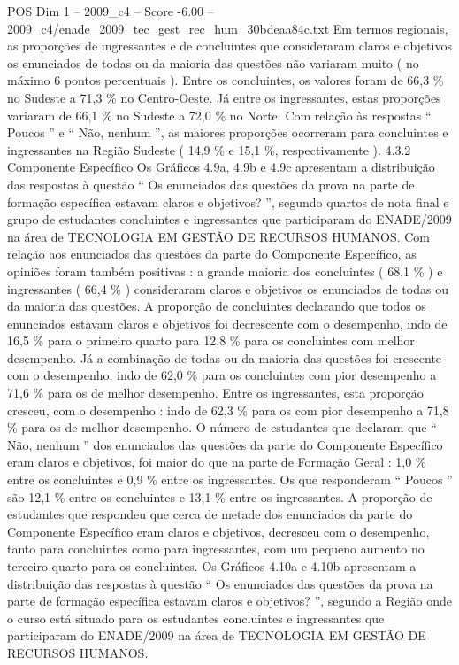 \begin{textsample}{POS Dim 1 – 2009\_c4 – Score -6.00 – 2009\_c4/enade\_2009\_tec\_gest\_rec\_hum\_30bdeaa84c.txt}
Em termos regionais, as proporções de ingressantes e de concluintes que consideraram claros e objetivos os enunciados de todas ou da maioria das questões não variaram muito ( no máximo 6 pontos percentuais ).
Entre os concluintes, os valores foram de 66,3 \% no Sudeste a 71,3 \% no Centro-Oeste.
Já entre os ingressantes, estas proporções variaram de 66,1 \% no Sudeste a 72,0 \% no Norte.
Com relação às respostas “ Poucos ” e “ Não, nenhum ”, as maiores proporções ocorreram para concluintes e ingressantes na Região Sudeste ( 14,9 \% e 15,1 \%, respectivamente ). 4.3.2 Componente Específico Os Gráficos 4.9a, 4.9b e 4.9c apresentam a distribuição das respostas à questão “ Os enunciados das questões da prova na parte de formação específica estavam claros e objetivos? ”, segundo quartos de nota final e grupo de estudantes concluintes e ingressantes que participaram do ENADE/2009 na área de TECNOLOGIA EM GESTÃO DE RECURSOS HUMANOS.
Com relação aos enunciados das questões da parte do Componente Específico, as opiniões foram também positivas : a grande maioria dos concluintes ( 68,1 \% ) e ingressantes ( 66,4 \% ) consideraram claros e objetivos os enunciados de todas ou da maioria das questões.
A proporção de concluintes declarando que todos os enunciados estavam claros e objetivos foi decrescente com o desempenho, indo de 16,5 \% para o primeiro quarto para 12,8 \% para os concluintes com melhor desempenho.
Já a combinação de todas ou da maioria das questões foi crescente com o desempenho, indo de 62,0 \% para os concluintes com pior desempenho a 71,6 \% para os de melhor desempenho.
Entre os ingressantes, esta proporção cresceu, com o desempenho : indo de 62,3 \% para os com pior desempenho a 71,8 \% para os de melhor desempenho.
O número de estudantes que declaram que “ Não, nenhum ” dos enunciados das questões da parte do Componente Específico eram claros e objetivos, foi maior do que na parte de Formação Geral : 1,0 \% entre os concluintes e 0,9 \% entre os ingressantes.
Os que responderam “ Poucos ” são 12,1 \% entre os concluintes e 13,1 \% entre os ingressantes.
A proporção de estudantes que respondeu que cerca de metade dos enunciados da parte do Componente Específico eram claros e objetivos, decresceu com o desempenho, tanto para concluintes como para ingressantes, com um pequeno aumento no terceiro quarto para os concluintes.
Os Gráficos 4.10a e 4.10b apresentam a distribuição das respostas à questão “ Os enunciados das questões da prova na parte de formação específica estavam claros e objetivos? ”, segundo a Região onde o curso está situado para os estudantes concluintes e ingressantes que participaram do ENADE/2009 na área de TECNOLOGIA EM GESTÃO DE RECURSOS HUMANOS.

\end{textsample}
